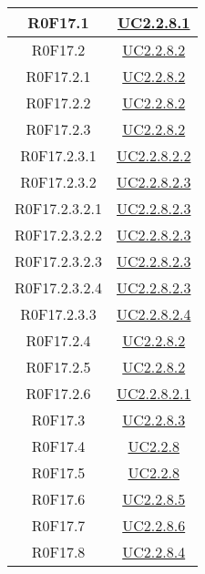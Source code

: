 \documentclass[../AnalisiDeiRequisiti.tex]{subfiles}
\begin{document}
\begin{longtable}{|c|c|}
	R0F17.1 & \hyperlink{UC2.2.8.1}{UC2.2.8.1}\\\hline
	R0F17.2 & \hyperlink{UC2.2.8.2}{UC2.2.8.2}\\\hline
	R0F17.2.1 & \hyperlink{UC2.2.8.2}{UC2.2.8.2}\\\hline
	R0F17.2.2 & \hyperlink{UC2.2.8.2}{UC2.2.8.2}\\\hline
	R0F17.2.3 & \hyperlink{UC2.2.8.2}{UC2.2.8.2}\\\hline
	R0F17.2.3.1 & \hyperlink{UC2.2.8.2.2}{UC2.2.8.2.2}\\\hline
	R0F17.2.3.2 & \hyperlink{UC2.2.8.2.3}{UC2.2.8.2.3}\\\hline
	R0F17.2.3.2.1 & \hyperlink{UC2.2.8.2.3}{UC2.2.8.2.3}\\\hline
	R0F17.2.3.2.2 & \hyperlink{UC2.2.8.2.3}{UC2.2.8.2.3}\\\hline
	R0F17.2.3.2.3 & \hyperlink{UC2.2.8.2.3}{UC2.2.8.2.3}\\\hline
	R0F17.2.3.2.4 & \hyperlink{UC2.2.8.2.3}{UC2.2.8.2.3}\\\hline
	R0F17.2.3.3 & \hyperlink{UC2.2.8.2.4}{UC2.2.8.2.4}\\\hline
	R0F17.2.4 & \hyperlink{UC2.2.8.2}{UC2.2.8.2}\\\hline
	R0F17.2.5 & \hyperlink{UC2.2.8.2}{UC2.2.8.2}\\\hline
	R0F17.2.6 & \hyperlink{UC2.2.8.2.1}{UC2.2.8.2.1}\\\hline
	R0F17.3 & \hyperlink{UC2.2.8.3}{UC2.2.8.3}\\\hline
	R0F17.4 & \hyperlink{UC2.2.8}{UC2.2.8}\\\hline
	R0F17.5 & \hyperlink{UC2.2.8}{UC2.2.8}\\\hline
	R0F17.6 & \hyperlink{UC2.2.8.5}{UC2.2.8.5}\\\hline
	R0F17.7 & \hyperlink{UC2.2.8.6}{UC2.2.8.6}\\\hline
	R0F17.8 & \hyperlink{UC2.2.8.4}{UC2.2.8.4}\\\hline

\end{longtable}
\end{document}
